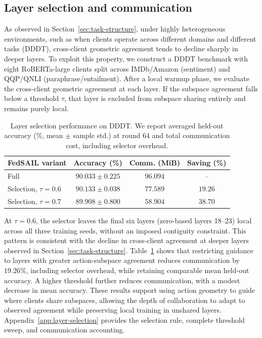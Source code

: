 \documentclass[11pt,letterpaper]{article}
\begin{document}
\subsection{Layer selection and communication}
\label{sec:layer-selection}

As observed in Section~\ref{sec:task-structure}, under highly heterogeneous environments, such as when clients operate across different domains and different tasks (DDDT), cross-client geometric agreement tends to decline sharply in deeper layers. To exploit this property, we construct a DDDT benchmark with eight RoBERTa-large clients split across IMDb/Amazon (sentiment) and QQP/QNLI (paraphrase/entailment). After a local warmup phase, we evaluate the cross-client geometric agreement at each layer. If the subspace agreement falls below a threshold $\tau$, that layer is excluded from subspace sharing entirely and remains purely local.
\begin{table}[!htbp]
    \centering
    \caption{Layer selection performance on DDDT. We report averaged held-out accuracy (\%, mean $\pm$ sample std.) at round $64$ and total communication cost, including selector overhead.}
    \label{tab:dddt-summary}
    \small
    \begin{tabular*}{\linewidth}{@{\extracolsep{\fill}}lccc@{}}
        \toprule
        FedSAIL variant & Accuracy (\%) & Comm. (MiB) & Saving (\%) \\
        \midrule
        Full & $90.033\pm0.225$ & $96.094$ & -- \\
        Selection, $\tau=0.6$ & $90.133\pm0.038$ & $77.589$ & $19.26$ \\
        Selection, $\tau=0.7$ & $89.908\pm0.800$ & $58.904$ & $38.70$ \\
        \bottomrule
    \end{tabular*}
\end{table}

At $\tau=0.6$, the selector leaves the final six layers (zero-based layers 18--23) local across all three training seeds, without an imposed contiguity constraint. This pattern is consistent with the decline in cross-client agreement at deeper layers observed in Section~\ref{sec:task-structure}. Table~\ref{tab:dddt-summary} shows that restricting guidance to layers with greater action-subspace agreement reduces communication by $19.26\%$, including selector overhead, while retaining comparable mean held-out accuracy. A higher threshold further reduces communication, with a modest decrease in mean accuracy. These results support using action geometry to guide where clients share subspaces, allowing the depth of collaboration to adapt to observed agreement while preserving local training in unshared layers. Appendix~\ref{app:layer-selection} provides the selection rule, complete threshold sweep, and communication accounting.
\end{document}
